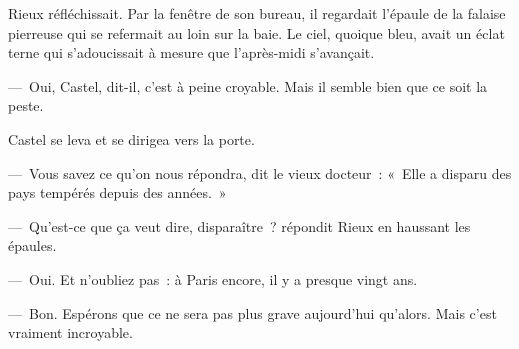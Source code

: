 \documentclass[french,twoside]{book} %
\begin{document}
Rieux réfléchissait. Par la fenêtre de son bureau, il regardait l’épaule de la falaise pierreuse qui se refermait au loin sur la baie. Le ciel, quoique bleu, avait un éclat terne qui s’adoucissait à mesure que l’après-midi s’avançait.\par
— Oui, Castel, dit-il, c’est à peine croyable. Mais il semble bien que ce soit la peste.\par
Castel se leva et se dirigea vers la porte.\par
— Vous savez ce qu’on nous répondra, dit le vieux docteur : « Elle a disparu des pays tempérés depuis des années. »\par
— Qu’est-ce que ça veut dire, disparaître ? répondit Rieux en haussant les épaules.\par
— Oui. Et n’oubliez pas : à Paris encore, il y a presque vingt ans.\par
— Bon. Espérons que ce ne sera pas plus grave aujourd’hui qu’alors. Mais c’est vraiment incroyable.
\end{document}
